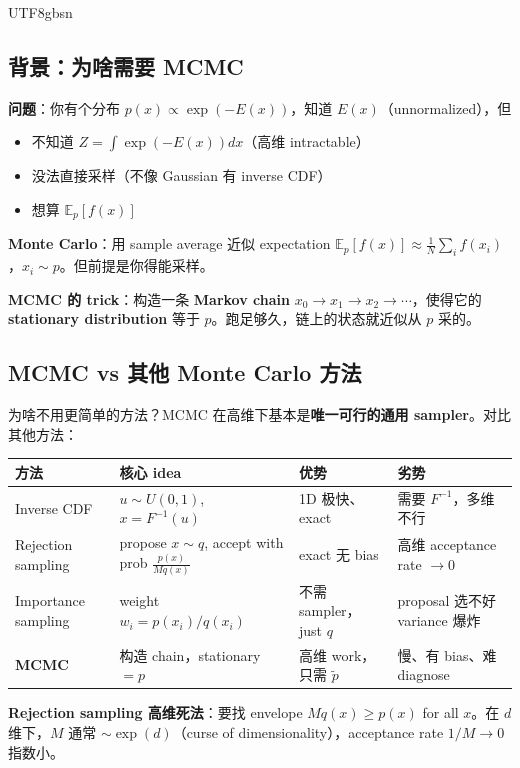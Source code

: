 \documentclass[11pt]{article}
\begin{document}
\begin{CJK}{UTF8}{gbsn}
\subsection{背景：为啥需要 MCMC}

\textbf{问题}：你有个分布 $p(x) \propto \exp(-E(x))$，知道 $E(x)$（unnormalized），但
\begin{itemize}[nosep]
  \item 不知道 $Z = \int \exp(-E(x)) dx$（高维 intractable）
  \item 没法直接采样（不像 Gaussian 有 inverse CDF）
  \item 想算 $\mathbb{E}_p[f(x)]$
\end{itemize}

\textbf{Monte Carlo}：用 sample average 近似 expectation $\mathbb{E}_p[f(x)] \approx \frac{1}{N} \sum_i f(x_i)$，$x_i \sim p$。但前提是你得能采样。

\textbf{MCMC 的 trick}：构造一条 \textbf{Markov chain} $x_0 \to x_1 \to x_2 \to \cdots$，使得它的 \textbf{stationary distribution} 等于 $p$。跑足够久，链上的状态就近似从 $p$ 采的。

\subsection{MCMC vs 其他 Monte Carlo 方法}

为啥不用更简单的方法？MCMC 在高维下基本是\textbf{唯一可行的通用 sampler}。对比其他方法：

\begin{center}
\begin{tabular}{|l|l|l|l|}
\hline
方法 & 核心 idea & 优势 & 劣势 \\
\hline
Inverse CDF & $u \sim U(0,1)$, $x = F^{-1}(u)$ & 1D 极快、exact & 需要 $F^{-1}$，多维不行 \\
Rejection sampling & propose $x \sim q$, accept with prob $\frac{p(x)}{Mq(x)}$ & exact 无 bias & 高维 acceptance rate $\to 0$ \\
Importance sampling & weight $w_i = p(x_i)/q(x_i)$ & 不需 sampler，just $q$ & proposal 选不好 variance 爆炸 \\
\textbf{MCMC} & 构造 chain，stationary $= p$ & 高维 work，只需 $\tilde p$ & 慢、有 bias、难 diagnose \\
\hline
\end{tabular}
\end{center}

\textbf{Rejection sampling 高维死法}：要找 envelope $M q(x) \geq p(x)$ for all $x$。在 $d$ 维下，$M$ 通常 $\sim \exp(d)$（curse of dimensionality），acceptance rate $1/M \to 0$ 指数小。


\end{CJK}
\end{document}
